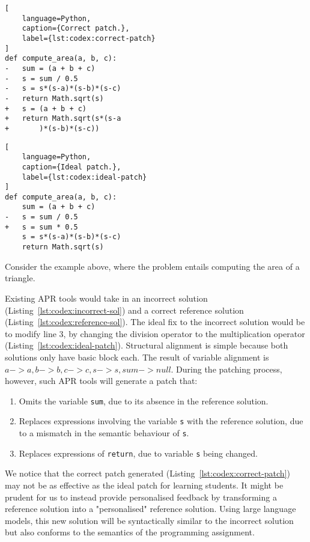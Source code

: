 \begin{multicols}{2}
\begin{lstlisting}[
    language=Python,
    caption={Correct patch.},
    label={lst:codex:correct-patch}
]
def compute_area(a, b, c):
-   sum = (a + b + c)
-   s = sum / 0.5
-   s = s*(s-a)*(s-b)*(s-c)
-   return Math.sqrt(s)
+   s = (a + b + c)
+   return Math.sqrt(s*(s-a
+       )*(s-b)*(s-c))
\end{lstlisting}

\columnbreak

\begin{lstlisting}[
    language=Python,
    caption={Ideal patch.},
    label={lst:codex:ideal-patch}
]
def compute_area(a, b, c):
    sum = (a + b + c)
-   s = sum / 0.5
+   s = sum * 0.5
    s = s*(s-a)*(s-b)*(s-c)
    return Math.sqrt(s)
\end{lstlisting}
\end{multicols}

Consider the example above, where the problem entails computing the area of a triangle.

Existing APR tools would take in an incorrect solution (Listing~\ref{lst:codex:incorrect-sol})
and a correct reference solution (Listing~\ref{lst:codex:reference-sol}).
The ideal fix to the incorrect solution would be to modify line 3, by changing the division
operator to the multiplication operator (Listing~\ref{lst:codex:ideal-patch}).
Structural alignment is simple because both solutions only have basic block each.
The result of variable alignment is ${a -> a, b -> b, c -> c, s -> s, sum -> null}$.
During the patching process, however, such APR tools will generate a patch that:
\begin{enumerate}
    \item Omits the variable \texttt{sum}, due to its absence in the reference solution.
    \item Replaces expressions involving the variable \texttt{s} with the reference
          solution, due to a mismatch in the semantic behaviour of \texttt{s}.
    \item Replaces expressions of \texttt{return}, due to variable \texttt{s} being
          changed.
\end{enumerate}

We notice that the correct patch generated (Listing~\ref{lst:codex:correct-patch}) may
not be as effective as the ideal patch for learning students.
It might be prudent for us to instead provide personalised feedback by transforming a
reference solution into a "personalised" reference solution.
Using large language models, this new solution will be syntactically similar to the
incorrect solution but also conforms to the semantics of the programming assignment.

